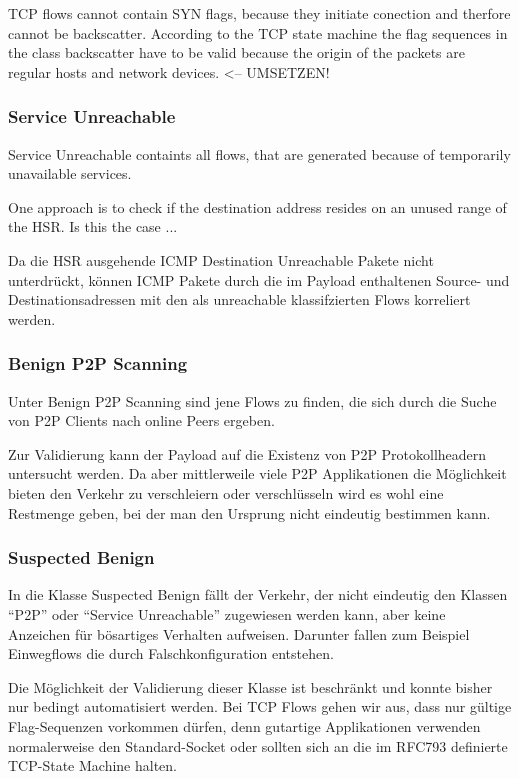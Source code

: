 \documentclass[a4paper]{scrartcl}
\begin{document}
TCP flows cannot contain SYN flags, because they initiate conection and therfore cannot be backscatter. According to the TCP state machine the flag sequences in the class backscatter have to be valid because the origin of the packets are regular hosts and network devices. <-- UMSETZEN!

\subsubsection{Service Unreachable}
Service Unreachable containts all flows, that are generated because of temporarily unavailable services.

One approach is to check if the destination address resides on an unused range of the HSR. Is this the case ...

Da\cite{rfc_icmp} die HSR ausgehende ICMP Destination Unreachable Pakete nicht unterdrückt, können ICMP Pakete durch die im Payload enthaltenen Source- und Destinationsadressen mit den als unreachable klassifzierten Flows korreliert werden.  


\subsubsection{Benign P2P Scanning}
Unter Benign P2P Scanning sind jene Flows zu finden, die sich durch die Suche von P2P Clients nach online Peers ergeben.

Zur Validierung kann der Payload auf die Existenz von P2P Protokollheadern untersucht werden. Da aber mittlerweile viele P2P Applikationen die Möglichkeit bieten den Verkehr zu verschleiern \cite{emule} oder verschlüsseln \cite{vuze} wird es wohl eine Restmenge geben, bei der man den Ursprung nicht eindeutig bestimmen kann.

\subsubsection{Suspected Benign}
In die Klasse Suspected Benign fällt der Verkehr, der nicht eindeutig den Klassen ``P2P'' oder ``Service Unreachable'' zugewiesen werden kann, aber keine Anzeichen für bösartiges Verhalten aufweisen. Darunter fallen zum Beispiel Einwegflows die durch Falschkonfiguration entstehen.

Die  Möglichkeit der Validierung dieser Klasse ist beschränkt und konnte bisher nur bedingt automatisiert werden. Bei TCP Flows gehen wir aus, dass nur gültige Flag-Sequenzen vorkommen dürfen, denn gutartige Applikationen verwenden normalerweise den Standard-Socket oder sollten sich an die im RFC793 \cite{rfc_tcp} definierte TCP-State Machine halten.
\end{document}
